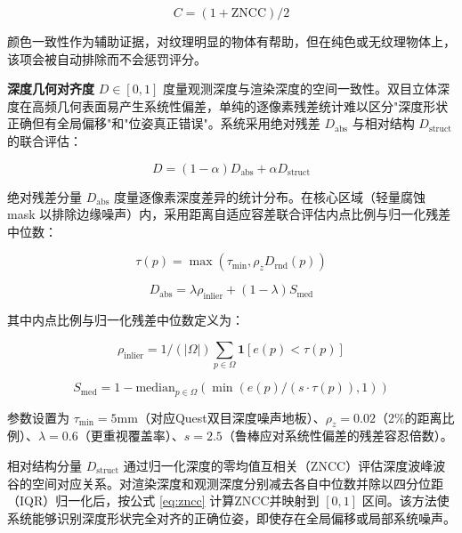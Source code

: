 \documentclass[review]{vgtc}
\begin{document}
\begin{equation}
C = (1 + \mathrm{ZNCC}) / 2
\label{eq:color-sim}
\end{equation}


颜色一致性作为辅助证据，对纹理明显的物体有帮助，但在纯色或无纹理物体上，该项会被自动排除而不会惩罚评分。

\textbf{深度几何对齐度} $D \in [0,1]$ 度量观测深度与渲染深度的空间一致性。双目立体深度在高频几何表面易产生系统性偏差，单纯的逐像素残差统计难以区分"深度形状正确但有全局偏移"和"位姿真正错误"。系统采用绝对残差 $D_{\mathrm{abs}}$ 与相对结构 $D_{\mathrm{struct}}$ 的联合评估：

\begin{equation}
D = (1-\alpha) D_{\mathrm{abs}} + \alpha D_{\mathrm{struct}}
\label{eq:depth-joint}
\end{equation}


绝对残差分量 $D_{\mathrm{abs}}$ 度量逐像素深度差异的统计分布。在核心区域（轻量腐蚀 mask 以排除边缘噪声）内，采用距离自适应容差联合评估内点比例与归一化残差中位数：

\begin{equation}
\tau(p) = \max\!\left(\tau_{\mathrm{min}}, \rho_z D_{\mathrm{rnd}}(p)\right)
\label{eq:depth-thresh}
\end{equation}


\begin{equation}
D_{\mathrm{abs}} = \lambda \rho_{\mathrm{inlier}} + (1-\lambda) S_{\mathrm{med}}
\label{eq:depth-abs}
\end{equation}


其中内点比例与归一化残差中位数定义为：

\begin{equation}
\rho_{\mathrm{inlier}} = 1/(\lvert \Omega \rvert) \sum_{p \in \Omega} \mathbf{1}[e(p) < \tau(p)]
\end{equation}


\begin{equation}
S_{\mathrm{med}} = 1 - \mathrm{median}_{p \in \Omega} (\min\!\left(e(p)/(s \cdot \tau(p)), 1\right))
\label{eq:depth-stats}
\end{equation}


参数设置为 $\tau_{\mathrm{min}} = 5 \mathrm{mm}$（对应Quest双目深度噪声地板）、$\rho_z = 0.02$（2\%的距离比例）、$\lambda = 0.6$（更重视覆盖率）、$s = 2.5$（鲁棒应对系统性偏差的残差容忍倍数）。

相对结构分量 $D_{\mathrm{struct}}$ 通过归一化深度的零均值互相关（ZNCC）评估深度波峰波谷的空间对应关系。对渲染深度和观测深度分别减去各自中位数并除以四分位距（IQR）归一化后，按公式 \ref{eq:zncc} 计算ZNCC并映射到 $[0,1]$ 区间。该方法使系统能够识别深度形状完全对齐的正确位姿，即使存在全局偏移或局部系统噪声。
\end{document}
